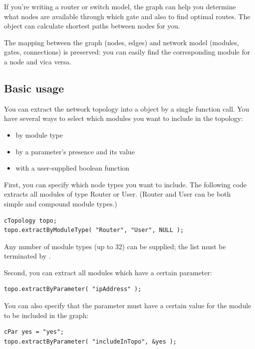 If you're writing a router or switch model, the 
graph can help you determine what nodes are available through which
gate and also to find optimal routes. The
 object can calculate shortest paths between nodes for you.

The mapping between the graph (nodes, edges) and network model
(modules, gates, connections) is preserved: you can easily find
the corresponding module for a  node and vica versa.





\subsection{Basic usage}

You can extract the network topology into a 
object by a single function call. You have several ways to select
which modules you want to include in the topology:
\begin{itemize}
  \item{by module type}
  \item{by a parameter's presence and its value}
  \item{with a user-supplied boolean function}
\end{itemize}

First, you can specify which node types you want to include. The
following code extracts all modules of type Router or User. (Router
and User can be both simple and compound module types.)

\begin{verbatim}
cTopology topo;
topo.extractByModuleType( "Router", "User", NULL );
\end{verbatim}


Any number of module types (up to 32) can be supplied; the list
must be terminated by .

Second, you can extract all modules which have a certain parameter:

\begin{verbatim}
topo.extractByParameter( "ipAddress" );
\end{verbatim}


You can also specify that the parameter must have a certain value
for the module to be included in the graph:

\begin{verbatim}
cPar yes = "yes";
topo.extractByParameter( "includeInTopo", &yes );
\end{verbatim}

